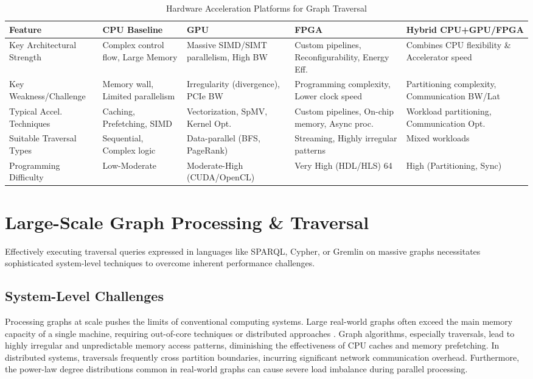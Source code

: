 \documentclass[sigconf,natbib=false]{acmart}
\begin{document}
\begin{table*}
	\centering
	\caption{Hardware Acceleration Platforms for Graph Traversal}
	\label{tab:hardwarePlatforms}
	\begin{tabulary}{\linewidth}{|L||L|L|L|L|}
		\hline
		Feature               & CPU Baseline                                     & GPU                                   & FPGA                                             & Hybrid CPU+GPU/FPGA \\
		\hline
		\hline
		Key Architectural Strength & Complex control flow, Large Memory & Massive SIMD/SIMT parallelism, High BW & Custom pipelines, Reconfigurability, Energy Eff. & Combines CPU flexibility \& Accelerator speed \\
		\hline
		Key Weakness/Challenge & Memory wall, Limited parallelism & Irregularity (divergence), PCIe BW & Programming complexity, Lower clock speed & Partitioning complexity, Communication BW/Lat \\
		\hline
		Typical Accel. Techniques & Caching, Prefetching, SIMD & Vectorization, SpMV, Kernel Opt. & Custom pipelines, On-chip memory, Async proc. & Workload partitioning, Communication Opt. \\
		\hline
		Suitable Traversal Types & Sequential, Complex logic & Data-parallel (BFS, PageRank) & Streaming, Highly irregular patterns & Mixed workloads \\
		Programming Difficulty & Low-Moderate & Moderate-High (CUDA/OpenCL) & Very High (HDL/HLS) 64 & High (Partitioning, Sync) \\
		\hline
	\end{tabulary}
\end{table*}

\section{Large-Scale Graph Processing \& Traversal}
Effectively executing traversal queries expressed in languages like SPARQL, Cypher, or Gremlin on massive graphs necessitates sophisticated system-level techniques to overcome inherent performance challenges.

\subsection{System-Level Challenges}
Processing graphs at scale pushes the limits of conventional computing systems.
Large real-world graphs often exceed the main memory capacity of a single machine, requiring out-of-core techniques or distributed approaches \cite{liu2020LargescaleGraphProcessing}.
Graph algorithms, especially traversals, lead to highly irregular and unpredictable memory access patterns, diminishing the effectiveness of CPU caches and memory prefetching. %
In distributed systems, traversals frequently cross partition boundaries, incurring significant network communication overhead. %
Furthermore, the power-law degree distributions common in real-world graphs can cause severe load imbalance during parallel processing. %
\end{document}
